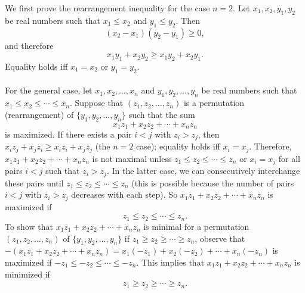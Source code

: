 \documentclass[12pt]{article}
\begin{document}
We first prove the rearrangement inequality for the case $n=2$.  Let
$x_1,x_2,y_1,y_2$ be real numbers such that $x_1\le x_2$ and $y_1\le
y_2$.  Then
$$
(x_2-x_1)(y_2-y_1)\ge 0,
$$
and therefore
$$
x_1y_1+x_2y_2\ge x_1y_2+x_2y_1.
$$ Equality holds iff $x_1=x_2$ or $y_1=y_2$.\\
\\
For the general case, let $x_1,x_2,\ldots,x_n$ and
$y_1,y_2,\ldots,y_n$ be real numbers such that $x_1\le x_2\le\cdots\le
x_n$.  Suppose that $(z_1,z_2,\ldots,z_n)$ is a permutation
(rearrangement) of $\{y_1,y_2,\ldots,y_n\}$ such that the sum
$$
x_1z_1+x_2z_2+\cdots+x_nz_n
$$
is maximized.  If there exists a pair $i<j$ with $z_i>z_j$, then
$x_iz_j+x_jz_i\ge x_iz_i+x_jz_j$ (the $n=2$ case); equality holds iff
$x_i=x_j$.  Therefore, $x_1z_1+x_2z_2+\cdots+x_nz_n$ is not maximal
unless $z_1\le z_2\le\cdots\le z_n$ or $x_i=x_j$ for all pairs $i<j$
such that $z_i>z_j$.  In the latter case, we can consecutively
interchange these pairs until $z_1\le z_2\le\cdots\le z_n$ (this is
possible because the number of pairs $i<j$ with $z_i>z_j$ decreases
with each step).  So $x_1z_1+x_2z_2+\cdots+x_nz_n$ is maximized if
$$
z_1\le z_2\le\cdots\le z_n.
$$
To show that $x_1z_1+x_2z_2+\cdots+x_nz_n$ is minimal for a
permutation $(z_1,z_2,\ldots,z_n)$ of $\{y_1,y_2,\ldots,y_n\}$ if
$z_1\ge z_2\ge\cdots\ge z_n$, observe that
$-(x_1z_1+x_2z_2+\cdots+x_nz_n)=x_1(-z_1)+x_2(-z_2)+\cdots+x_n(-z_n)$
is maximized if $-z_1\le-z_2\le\cdots\le-z_n$.  This implies that
$x_1z_1+x_2z_2+\cdots+x_nz_n$ is minimized if
$$
z_1\ge z_2\ge\cdots\ge z_n.
$$
\end{document}
